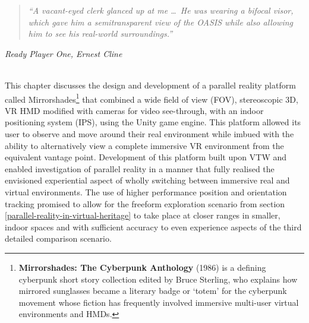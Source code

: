 \begin{quote}
	\textit{``A vacant-eyed clerk glanced up at me \ldots\ He was wearing a bifocal visor, which gave him a semitransparent view of the OASIS while also allowing him to see his real-world surroundings.''}%
\end{quote}
\hfill \textit{Ready Player One, Ernest Cline}
\\
\\


\label{chapter-mirrorshades}

This chapter discusses the design and development of a parallel reality platform called Mirrorshades\footnote{\textbf{Mirrorshades: The Cyberpunk Anthology} (1986) is a defining cyberpunk short story collection edited by Bruce Sterling, who explains how mirrored sunglasses became a literary badge or `totem' for the cyberpunk movement whose fiction has frequently involved immersive multi-user virtual environments and HMDs.} that combined a wide field of view (FOV), stereoscopic 3D, VR HMD modified with cameras for video see-through, with an indoor positioning system (IPS), using the Unity game engine. This platform allowed its user to observe and move around their real environment while imbued with the ability to alternatively view a complete immersive VR environment from the equivalent vantage point. Development of this platform built upon VTW and enabled investigation of parallel reality in a manner that fully realised the envisioned experiential aspect of wholly switching between immersive real and virtual environments. The use of higher performance position and orientation tracking promised to allow for the freeform exploration scenario from section \ref{parallel-reality-in-virtual-heritage} to take place at closer ranges in smaller, indoor spaces and with sufficient accuracy to even experience aspects of the third detailed comparison scenario.


